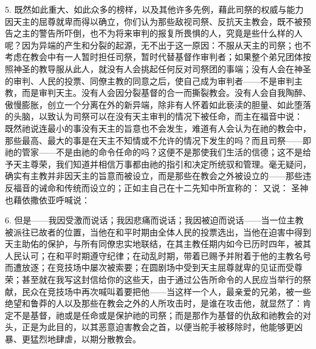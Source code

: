 5. 既然如此重大、如此众多的榜样，以及其他许多先例，藉此司祭的权威与能力因天主的屈尊就卑而得以确立，你们认为那些敌视司祭、反抗天主教会，既不被预告之主的警告所吓倒，也不为将来审判的报复所畏惧的人，究竟是些什么样的人呢？因为异端的产生和分裂的起源，无不出于这一原因：不服从天主的司祭；也不考虑在教会中有一人暂时担任司祭，暂时代替基督作审判者；如果整个弟兄团体按照神圣的教导服从此人，就没有人会挑起任何反对司祭团的事端；没有人会在神圣的审判、人民的投票、同僚主教的同意之后，使自己成为审判者——不是审判主教，而是审判天主。没有人会因分裂基督的合一而撕裂教会。没有人会自我陶醉、傲慢膨胀，创立一个分离在外的新异端，除非有人怀着如此亵渎的胆量、如此堕落的头脑，以致认为司祭可以在没有天主审判的情况下被任命，而主在福音中说： 既然祂说连最小的事没有天主的旨意也不会发生，难道有人会认为在祂的教会中，那些最高、最大的事是在天主不知情或不允许的情况下发生的吗？而且司祭——即祂的管家——不是由祂的命令任命的吗？这便不是那使我们生活的信德；这不是给予天主尊荣，我们知道并相信万事都由祂的指引和决定所统驭和管理。毫无疑问，确实有主教并非因天主的旨意而被设立，而是那些在教会之外被设立的——那些违反福音的诫命和传统而设立的；正如主自己在十二先知中所宣称的： 又说： 圣神也藉依撒依亚呼喊说：\par

6. 但是——我因受激而说话；我因悲痛而说话；我因被迫而说话——当一位主教被派往已故者的位置，当他在和平时期由全体人民的投票选出，当他在迫害中得到天主助佑的保护，与所有同僚忠实地联结，在其主教任期内如今已历时四年，被其人民认可；在和平时期遵守纪律；在动乱时期，带着已赐予并附着于他的主教名号而遭放逐；在竞技场中屡次被索要；在圆剧场中受到天主屈尊就卑的见证而受尊荣；甚至就在我写这封信给你的这些天，由于通过公告所命令的人民应当举行的祭献，民众在竞技场中再次喊叫着要把他——当这样一个人，最亲爱的兄弟，被一些绝望和鲁莽的人以及那些在教会之外的人所攻击时，是谁在攻击他，就显然了：肯定不是基督，祂或是任命或是保护祂的司祭；而是那作为基督的仇敌和祂教会的对头，正是为此目的，以其恶意迫害教会之首，以便当舵手被移除时，他能够更凶暴、更猛烈地肆虐，以期分散教会。\par

